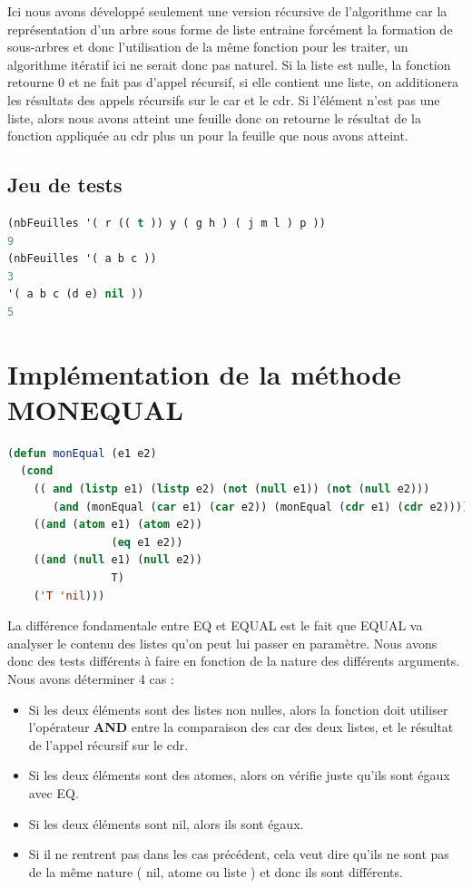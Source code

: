 \documentclass[a4paper,10pt]{report}
\begin{document}
	Ici nous avons développé seulement une version récursive de l'algorithme car la représentation d'un arbre sous forme de liste entraine forcément la formation de sous-arbres et donc l'utilisation
	de la même fonction pour les traiter, un algorithme itératif ici ne serait donc pas naturel. Si la liste est nulle, la fonction retourne 0 et ne fait pas d'appel récursif,
	si elle contient une liste, on additionera les résultats des appels récursifs sur le car et le cdr. Si l'élément n'est pas une liste, alors nous avons atteint une feuille
	donc on retourne le résultat de la fonction appliquée au cdr plus un pour la feuille que nous avons atteint.
	
	  \subsection{Jeu de tests}
	\begin{lstlisting}[language=Lisp]
(nbFeuilles '( r (( t )) y ( g h ) ( j m l ) p ))
9
(nbFeuilles '( a b c ))
3
'( a b c (d e) nil ))
5
	\end{lstlisting}\newpage
	\section{Implémentation de la méthode MONEQUAL}
	  \begin{lstlisting}[language=Lisp]
(defun monEqual (e1 e2)
  (cond 
    (( and (listp e1) (listp e2) (not (null e1)) (not (null e2)))
       (and (monEqual (car e1) (car e2)) (monEqual (cdr e1) (cdr e2))))
    ((and (atom e1) (atom e2))
                (eq e1 e2))
    ((and (null e1) (null e2))
                T)
    ('T 'nil)))
	  \end{lstlisting}

	  La différence fondamentale entre EQ et EQUAL est le fait que EQUAL va analyser le contenu des listes qu'on peut lui passer en paramètre. Nous avons donc des tests différents
	  à faire en fonction de la nature des différents arguments. Nous avons déterminer 4 cas :
	  \begin{itemize}
	   \item Si les deux éléments sont des listes non nulles, alors la fonction doit utiliser l'opérateur \textbf{AND} entre la comparaison des car des deux listes, et le résultat de l'appel récursif sur le cdr.
	   \item Si les deux éléments sont des atomes, alors on vérifie juste qu'ils sont égaux avec EQ.
	   \item Si les deux éléments sont nil, alors ils sont égaux.
	   \item Si il ne rentrent pas dans les cas précédent, cela veut dire qu'ils ne sont pas de la même nature ( nil, atome ou liste ) et donc ils sont différents.
	  \end{itemize}
\end{document}
